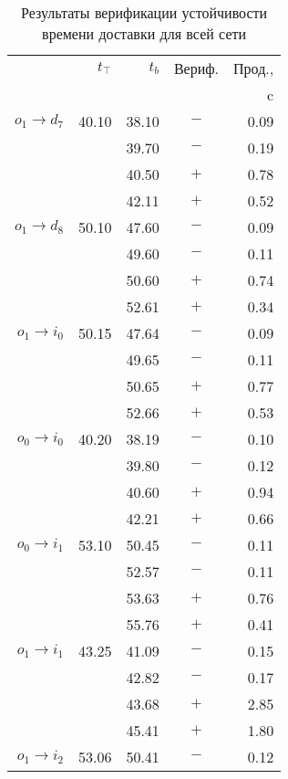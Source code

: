 \documentclass[a4paper]{article}
\newcommand{\sprule}{\rule{0pt}{1.3em}}
\begin{document}
\begin{longtable}{rrrcr}
\caption{Результаты верификации устойчивости времени доставки для всей сети}
\label{res1}\\
    \toprule
    & $t_{\top}$ & $t_b$ & Вериф. & Прод., \\
    &         &       &        & c \\
    \midrule
    $o_1 \to d_7$ & 40.10 & 38.10 & $-$ & 0.09 \\
              &       & 39.70 & $-$ & 0.19 \\
              &       & 40.50 & $+$ & 0.78 \\
              &       & 42.11 & $+$ & 0.52 \\
    \sprule
    $o_1 \to d_8$ & 50.10 & 47.60 & $-$ & 0.09 \\
              &       & 49.60 & $-$ & 0.11 \\
              &       & 50.60 & $+$ & 0.74 \\
              &       & 52.61 & $+$ & 0.34 \\
    \newpage
    \sprule
    $o_1 \to i_0$ & 50.15 & 47.64 & $-$ & 0.09 \\
              &       & 49.65 & $-$ & 0.11 \\
              &       & 50.65 & $+$ & 0.77 \\
              &       & 52.66 & $+$ & 0.53 \\
    \sprule
    $o_0 \to i_0$ & 40.20 & 38.19 & $-$ & 0.10 \\
              &       & 39.80 & $-$ & 0.12 \\
              &       & 40.60 & $+$ & 0.94 \\
              &       & 42.21 & $+$ & 0.66 \\ 
    \sprule
    $o_0 \to i_1$ & 53.10 & 50.45 & $-$ & 0.11 \\
              &       & 52.57 & $-$ & 0.11 \\
              &       & 53.63 & $+$ & 0.76 \\
              &       & 55.76 & $+$ & 0.41 \\
    \sprule
    $o_1 \to i_1$ & 43.25 & 41.09 & $-$ & 0.15 \\
              &       & 42.82 & $-$ & 0.17 \\
              &       & 43.68 & $+$ & 2.85 \\
              &       & 45.41 & $+$ & 1.80 \\
    \sprule
    $o_1 \to i_2$ & 53.06 & 50.41 & $-$ & 0.12 \\

\end{longtable}
\end{document}
